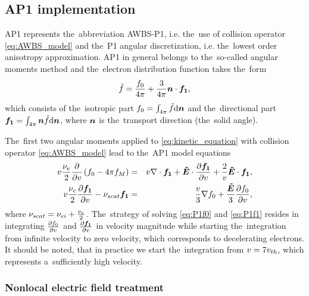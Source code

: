 \subsection{AP1 implementation}
\label{sec:C7code}

AP1 represents the~abbreviation AWBS-P1, i.e. the~use of collision operator 
\eqref{eq:AWBS_model} and the~P1 angular discretization, i.e. the~lowest order 
anisotropy approximation. AP1 in general belongs to the~so-called angular 
moments method and the~electron distribution function takes the~form
\begin{equation}
  \tilde{f} = \frac{f_0}{4\pi} + \frac{3}{4\pi}\boldsymbol{n}\cdot\boldsymbol{f_1} , 
  \nonumber \label{eq:P1approximation}
\end{equation}
which consists of the~isotropic part $f_0 = \int_{4\pi} \tilde{f} \text{d}\boldsymbol{n}$ 
and the~directional part $\boldsymbol{f_1} = \int_{4\pi} \boldsymbol{n}
\tilde{f} \text{d}\boldsymbol{n}$, where $\boldsymbol{n}$ is the~transport direction (the~solid angle).

The~first two angular moments applied to \eqref{eq:kinetic_equation}
with collision operator \eqref{eq:AWBS_model} lead to the~AP1 model equations
\begin{eqnarray}
  v\frac{\nu_{e}}{2}\frac{\partial{}}{\partial{v}}\left(f_0 - 4\pi f_M \right) &=&
  v\nabla\cdot\boldsymbol{f_1} + \boldsymbol{\tilde{E}}\cdot
  \frac{\partial{\boldsymbol{f_1}}}{\partial{v}} + \frac{2}{v}\boldsymbol{\tilde{E}}\cdot\boldsymbol{f_1} , 
  \label{eq:P1f0}\\
  v\frac{\nu_{e}}{2}\frac{\partial{\boldsymbol{f_1}}}{\partial{v}}
  - \nu_{scat}\boldsymbol{f_1} &=& 
  \frac{v}{3}\nabla f_0 + 
  \frac{\boldsymbol{\tilde{E}}}{3}\frac{\partial{f_0}}{\partial{v}} ,
  \label{eq:P1f1}
\end{eqnarray}
where $\nu_{scat} = \nu_{ei} + \frac{\nu_{e}}{2}$. The~strategy of solving 
\eqref{eq:P1f0} and \eqref{eq:P1f1} resides in integrating $\frac{\partial{f_0}}{\partial{v}}$
and $\frac{\partial{\boldsymbol{f_1}}}{\partial{v}}$ in velocity magnitude while starting the~integration
from infinite velocity to zero velocity, which corresponds to decelerating 
electrons. It should be noted, that in practice we start the~integration from
$v = 7 v_{th}$, which represents a~sufficiently high velocity.

\subsubsection{Nonlocal electric field treatment}
\label{sec:Efield}

